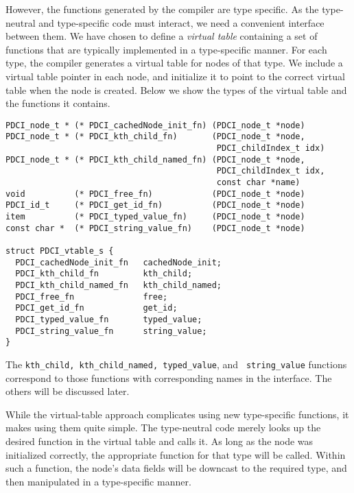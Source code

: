 \documentclass{article}
\begin{document}
However, the \pads functions generated by the compiler are type
specific. As the type-neutral and type-specific code must interact, we
need a convenient interface between them. 
We have chosen to define a {\em virtual table} containing a set of
functions that are typically implemented in a type-specific manner.
For each type, the compiler generates a virtual table for nodes of
that type. We include a virtual table pointer in each node, and
initialize it to point to the correct virtual table when the node is
created. Below we show the types of the virtual table and the
functions it contains.
\begin{verbatim}
PDCI_node_t * (* PDCI_cachedNode_init_fn) (PDCI_node_t *node) 
PDCI_node_t * (* PDCI_kth_child_fn)       (PDCI_node_t *node, 
                                           PDCI_childIndex_t idx) 
PDCI_node_t * (* PDCI_kth_child_named_fn) (PDCI_node_t *node, 
                                           PDCI_childIndex_t idx, 
                                           const char *name) 
void          (* PDCI_free_fn)            (PDCI_node_t *node)
PDCI_id_t     (* PDCI_get_id_fn)          (PDCI_node_t *node)
item          (* PDCI_typed_value_fn)     (PDCI_node_t *node) 
const char *  (* PDCI_string_value_fn)    (PDCI_node_t *node)

struct PDCI_vtable_s {
  PDCI_cachedNode_init_fn   cachedNode_init;
  PDCI_kth_child_fn         kth_child;
  PDCI_kth_child_named_fn   kth_child_named;
  PDCI_free_fn              free;
  PDCI_get_id_fn            get_id;
  PDCI_typed_value_fn       typed_value;
  PDCI_string_value_fn      string_value;
}
\end{verbatim}

The {\tt kth\_child, kth\_child\_named, typed\_value}, and {\tt
  string\_value} functions correspond to those functions with
corresponding names in the \pglx interface. The others will be
discussed later.

While the virtual-table approach complicates using new type-specific
functions, it makes using them quite simple.  The type-neutral code
merely looks up the desired function in the virtual table and calls
it. As long as the node was initialized correctly, the appropriate
function for that type will be called. Within such a function, the
node's data fields will be downcast to the required type, and then
manipulated in a type-specific manner.
\end{document}
